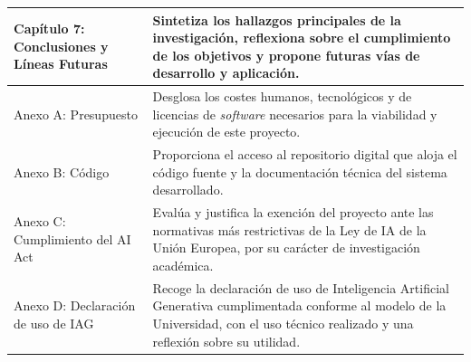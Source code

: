 \begin{table}[H]
{\begin{tabular}{p{3cm} p{11cm}}
            Capítulo 7: Conclusiones y Líneas Futuras & Sintetiza los hallazgos principales de la investigación, reflexiona sobre el cumplimiento de los objetivos y propone futuras vías de desarrollo y aplicación. \\ \hline
            
            Anexo A: Presupuesto & Desglosa los costes humanos, tecnológicos y de licencias de \textit{software} necesarios para la viabilidad y ejecución de este proyecto. \\ \hline

    
            Anexo B: Código & Proporciona el acceso al repositorio digital que aloja el código fuente y la documentación técnica del sistema desarrollado. \\ \hline


            Anexo C: Cumplimiento del AI Act & Evalúa y justifica la exención del proyecto ante las normativas más restrictivas de la Ley de IA de la Unión Europea, por su carácter de investigación académica. \\ \hline
            Anexo D: Declaración de uso de IAG & Recoge la declaración de uso de Inteligencia Artificial Generativa cumplimentada conforme al modelo de la Universidad, con el uso técnico realizado y una reflexión sobre su utilidad. \\ \hline
        \end{tabular}
    }
\end{table}

\newpage

